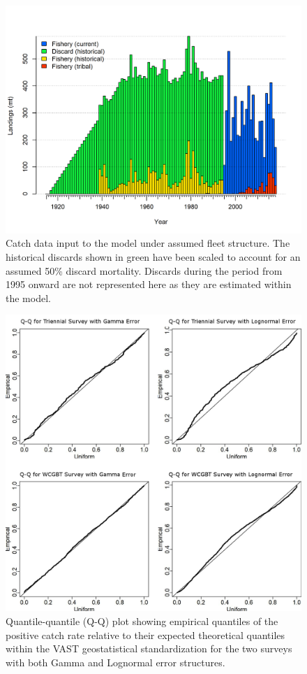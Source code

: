 \documentclass[12pt,]{article}
\begin{document}
\begin{figure}
\centering
\includegraphics{r4ss/plots_mod1/catch2 landings stacked.png}
\caption{Catch data input to the model under assumed fleet structure.
The historical discards shown in green have been scaled to account for
an assumed 50\% discard mortality. Discards during the period from 1995
onward are not represented here as they are estimated within the model.
\label{fig:catch_input_plot}}
\end{figure}

\FloatBarrier

\begin{figure}
\centering
\includegraphics{Figures/VAST_QQ_plots.png}
\caption{Quantile-quantile (Q-Q) plot showing empirical quantiles of the
positive catch rate relative to their expected theoretical quantiles
within the VAST geostatistical standardization for the two surveys with
both Gamma and Lognormal error structures.\label{fig:VAST_QQ_plots}}
\end{figure}
\end{document}
